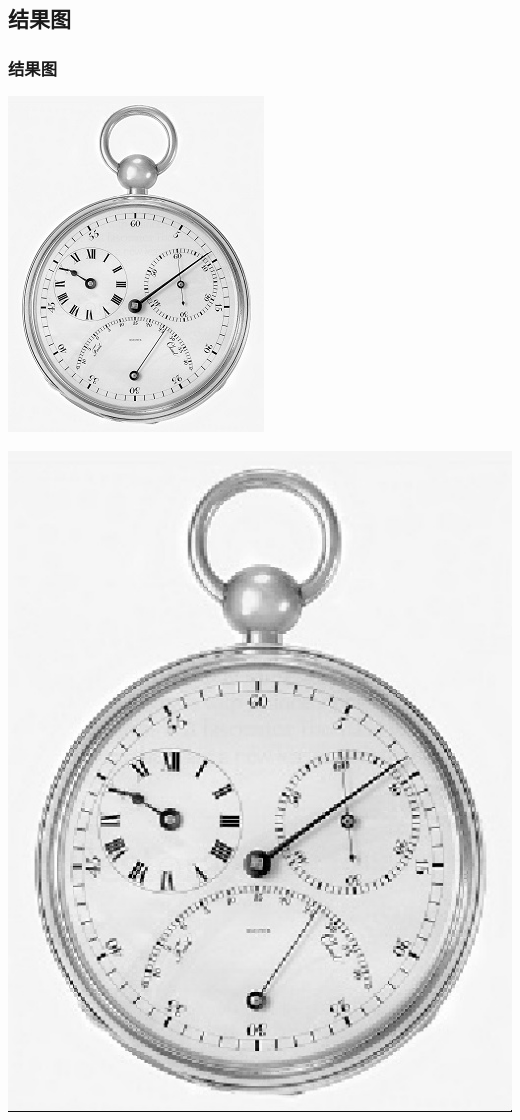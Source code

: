 \documentclass[notheorems,serif,table,compress]{beamer}  %
\begin{document}
\subsection{结果图}
\begin{frame}
\frametitle{结果图}
	\begin{minipage}[t]{0.4\linewidth}
        \centering
        \includegraphics[width=0.5\linewidth]{1.jpg} 
        \end{minipage}
	\begin{minipage}[t]{0.4\linewidth}
        \centering
        \includegraphics[width=1\linewidth]{nearest.jpg} 
        \end{minipage}

\end{frame}
\end{document}
